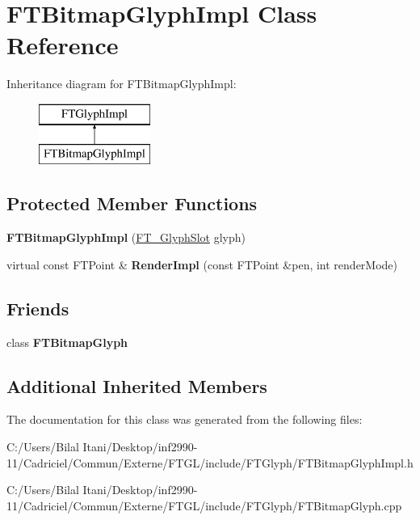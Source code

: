 \hypertarget{class_f_t_bitmap_glyph_impl}{}\section{F\+T\+Bitmap\+Glyph\+Impl Class Reference}
\label{class_f_t_bitmap_glyph_impl}
Inheritance diagram for F\+T\+Bitmap\+Glyph\+Impl\+:\begin{figure}[H]
\begin{center}
\leavevmode
\includegraphics[height=2.000000cm]{class_f_t_bitmap_glyph_impl}
\end{center}
\end{figure}
\subsection*{Protected Member Functions}
\begin{DoxyCompactItemize}
\item 
{\bfseries F\+T\+Bitmap\+Glyph\+Impl} (\hyperlink{struct_f_t___glyph_slot_rec__}{F\+T\+\_\+\+Glyph\+Slot} glyph)\hypertarget{class_f_t_bitmap_glyph_impl_a4462585cd1fc2e461ff8c6a0b49c68b3}{}\label{class_f_t_bitmap_glyph_impl_a4462585cd1fc2e461ff8c6a0b49c68b3}

\item 
virtual const F\+T\+Point \& {\bfseries Render\+Impl} (const F\+T\+Point \&pen, int render\+Mode)\hypertarget{class_f_t_bitmap_glyph_impl_a31a412b09a68489ab2e96ad4524badde}{}\label{class_f_t_bitmap_glyph_impl_a31a412b09a68489ab2e96ad4524badde}

\end{DoxyCompactItemize}
\subsection*{Friends}
\begin{DoxyCompactItemize}
\item 
class {\bfseries F\+T\+Bitmap\+Glyph}\hypertarget{class_f_t_bitmap_glyph_impl_aa3f0c28a7cfbfa0e896973476f7ed49d}{}\label{class_f_t_bitmap_glyph_impl_aa3f0c28a7cfbfa0e896973476f7ed49d}

\end{DoxyCompactItemize}
\subsection*{Additional Inherited Members}


The documentation for this class was generated from the following files\+:\begin{DoxyCompactItemize}
\item 
C\+:/\+Users/\+Bilal Itani/\+Desktop/inf2990-\/11/\+Cadriciel/\+Commun/\+Externe/\+F\+T\+G\+L/include/\+F\+T\+Glyph/F\+T\+Bitmap\+Glyph\+Impl.\+h\item 
C\+:/\+Users/\+Bilal Itani/\+Desktop/inf2990-\/11/\+Cadriciel/\+Commun/\+Externe/\+F\+T\+G\+L/include/\+F\+T\+Glyph/F\+T\+Bitmap\+Glyph.\+cpp\end{DoxyCompactItemize}
